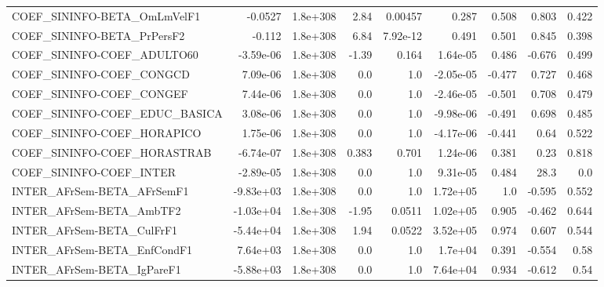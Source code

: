 \begin{tabular}{lrrrrrrrr}
COEF\_SININFO-BETA\_OmLmVelF1           &     -0.0527 &     1.8e+308 &    2.84 &  0.00457 &      0.287 &       0.508 &        0.803 &         0.422 \\
COEF\_SININFO-BETA\_PrPersF2            &      -0.112 &     1.8e+308 &    6.84 & 7.92e-12 &      0.491 &       0.501 &        0.845 &         0.398 \\
COEF\_SININFO-COEF\_ADULTO60            &   -3.59e-06 &     1.8e+308 &   -1.39 &    0.164 &   1.64e-05 &       0.486 &       -0.676 &         0.499 \\
COEF\_SININFO-COEF\_CONGCD              &    7.09e-06 &     1.8e+308 &     0.0 &      1.0 &  -2.05e-05 &      -0.477 &        0.727 &         0.468 \\
COEF\_SININFO-COEF\_CONGEF              &    7.44e-06 &     1.8e+308 &     0.0 &      1.0 &  -2.46e-05 &      -0.501 &        0.708 &         0.479 \\
COEF\_SININFO-COEF\_EDUC\_BASICA         &    3.08e-06 &     1.8e+308 &     0.0 &      1.0 &  -9.98e-06 &      -0.491 &        0.698 &         0.485 \\
COEF\_SININFO-COEF\_HORAPICO            &    1.75e-06 &     1.8e+308 &     0.0 &      1.0 &  -4.17e-06 &      -0.441 &         0.64 &         0.522 \\
COEF\_SININFO-COEF\_HORASTRAB           &   -6.74e-07 &     1.8e+308 &   0.383 &    0.701 &   1.24e-06 &       0.381 &         0.23 &         0.818 \\
COEF\_SININFO-COEF\_INTER               &   -2.89e-05 &     1.8e+308 &     0.0 &      1.0 &   9.31e-05 &       0.484 &         28.3 &           0.0 \\
INTER\_AFrSem-BETA\_AFrSemF1            &   -9.83e+03 &     1.8e+308 &     0.0 &      1.0 &   1.72e+05 &         1.0 &       -0.595 &         0.552 \\
INTER\_AFrSem-BETA\_AmbTF2              &   -1.03e+04 &     1.8e+308 &   -1.95 &   0.0511 &   1.02e+05 &       0.905 &       -0.462 &         0.644 \\
INTER\_AFrSem-BETA\_CulFrF1             &   -5.44e+04 &     1.8e+308 &    1.94 &   0.0522 &   3.52e+05 &       0.974 &        0.607 &         0.544 \\
INTER\_AFrSem-BETA\_EnfCondF1           &    7.64e+03 &     1.8e+308 &     0.0 &      1.0 &    1.7e+04 &       0.391 &       -0.554 &          0.58 \\
INTER\_AFrSem-BETA\_IgPareF1            &   -5.88e+03 &     1.8e+308 &     0.0 &      1.0 &   7.64e+04 &       0.934 &       -0.612 &          0.54 \\

\end{tabular}
